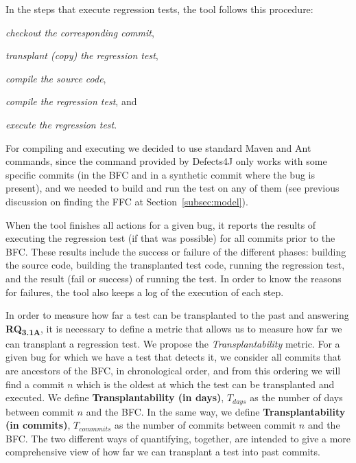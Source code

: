 In the steps that execute regression tests, the tool follows this procedure:
\begin{inparaenum}[\bf(1)]
\item \textit{checkout the corresponding commit},
\item \textit{transplant (copy) the regression test},
\item \textit{compile the source code},
\item \textit{compile the regression test}, and
\item \textit{execute the regression test}.
\end{inparaenum}
For compiling and executing we decided to use standard Maven and Ant commands, since the command provided by Defects4J only works with some specific commits (in the BFC and in a synthetic commit where the bug is present), and we needed to build and run the test on any of them (see previous discussion on finding the FFC at Section~\ref{subsec:model}). 

When the tool finishes all actions for a given bug, it reports the results of executing the regression test (if that was possible) for all commits prior to the BFC. These results include the success or failure of the different phases: building the source code, building the transplanted test code, running the regression test, and the result (fail or success) of running the test. 
In order to know the reasons for failures, the tool also keeps a log of the execution of each step.

In order to measure how far a test can be transplanted to the past and answering \textbf{RQ\textsubscript{3.1A}}, it is necessary to define a metric that allows us to measure how far we can transplant a regression test. 
We propose the \textit{Transplantability} metric. 
For a given bug for which we have a test that detects it, we consider all commits that are ancestors of the BFC, in chronological order, and from this ordering we will find a commit $n$ which is the oldest at which the test can be transplanted and executed. 
We define \textbf{Transplantability (in days)}, $T_{days}$ as the number of days between commit $n$ and the BFC. 
In the same way, we define \textbf{Transplantability (in commits)}, $T_{commmits}$ as the number of commits between 
commit $n$ and the BFC.
The two different ways of quantifying, together, are intended to give a more comprehensive view of how far we can transplant a test into past commits.

